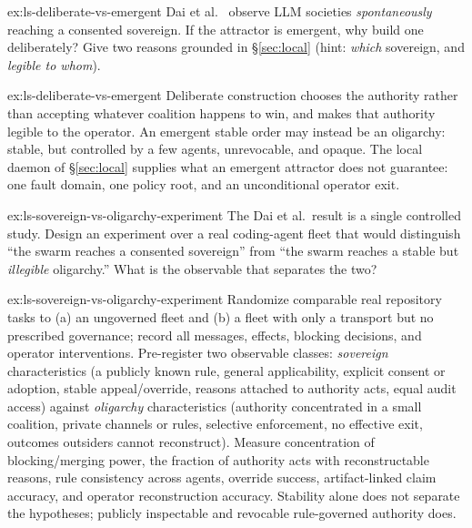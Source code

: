 \documentclass[11pt,a4paper]{article}
\theoremstyle{definition}
\theoremstyle{plain}
\begin{document}
\begin{pdexercise}[kind=Trace,rating=2]{ex:ls-deliberate-vs-emergent}
Dai et al.~ observe LLM societies \emph{spontaneously} reaching
a consented sovereign. If the attractor is emergent, why build one deliberately? Give
two reasons grounded in \S\ref{sec:local} (hint: \emph{which} sovereign, and
\emph{legible to whom}).
\end{pdexercise}
\begin{pdsolution}{ex:ls-deliberate-vs-emergent}
Deliberate construction chooses the authority rather than accepting whatever coalition happens to win, and makes that authority legible to the operator. An emergent stable order may instead be an oligarchy: stable, but controlled by a few agents, unrevocable, and opaque. The local daemon of \S\ref{sec:local} supplies what an emergent attractor does not guarantee: one fault domain, one policy root, and an unconditional operator exit.
\end{pdsolution}
\begin{pdexercise}[kind=Open,rating=3]{ex:ls-sovereign-vs-oligarchy-experiment}
The Dai et al.\ result is a single controlled study. Design an
experiment over a real coding-agent fleet that would distinguish ``the swarm reaches
a consented sovereign'' from ``the swarm reaches a stable but \emph{illegible}
oligarchy.'' What is the observable that separates the two?
\end{pdexercise}
\begin{pdsolution}{ex:ls-sovereign-vs-oligarchy-experiment}
Randomize comparable real repository tasks to (a) an ungoverned fleet and (b) a fleet with only a transport but no prescribed governance; record all messages, effects, blocking decisions, and operator interventions. Pre-register two observable classes: \emph{sovereign} characteristics (a publicly known rule, general applicability, explicit consent or adoption, stable appeal/override, reasons attached to authority acts, equal audit access) against \emph{oligarchy} characteristics (authority concentrated in a small coalition, private channels or rules, selective enforcement, no effective exit, outcomes outsiders cannot reconstruct). Measure concentration of blocking/merging power, the fraction of authority acts with reconstructable reasons, rule consistency across agents, override success, artifact-linked claim accuracy, and operator reconstruction accuracy. Stability alone does not separate the hypotheses; publicly inspectable and revocable rule-governed authority does.
\end{pdsolution}
\end{document}
